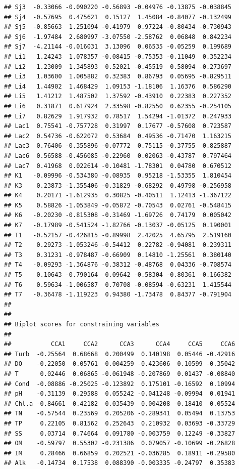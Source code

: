\documentclass[
]{book}
\begin{document}
\begin{verbatim}
## Sj3  -0.33066 -0.090220 -0.56893 -0.04976 -0.13875 -0.038845
## Sj4  -0.57695  0.475621  0.15127  1.45084 -0.84077 -0.132499
## Sj5  -0.85663  1.251094 -0.41979  0.97224 -0.80434 -0.730943
## Sj6  -1.97484  2.680997 -3.07550 -2.58762  0.06848  0.842234
## Sj7  -4.21144 -0.016031  3.13096  0.06535 -0.05259  0.199689
## Li1   1.24243  1.078357 -0.08415 -0.75353 -0.11049  0.352234
## Li2   1.23009  1.345893  0.52021 -0.45519  0.58094 -0.273697
## Li3   1.03600  1.005882  0.32383  0.86793  0.05695 -0.829511
## Li4   1.44902  1.468429  1.09153 -1.18106  1.16376  0.586290
## Li5   1.41212  1.487502  1.37592 -0.43910  0.22383  0.227352
## Li6   0.31871  0.617924  2.33598 -0.82550  0.62355 -0.254105
## Li7   0.82629  1.917932  0.78517  1.54294 -1.01372  0.247933
## Lac1  0.75541 -0.757728  0.31997  0.17677 -0.57608  0.723587
## Lac2  0.54736 -0.622072  0.53684  0.49536 -0.71470  1.163215
## Lac3  0.76406 -0.355896 -0.07772  0.75115 -0.37755  0.825887
## Lac6  0.56588 -0.456085 -0.22960  0.02063 -0.43787  0.797464
## Lac7  0.41968  0.022614 -0.10481 -1.78301  0.04780  0.670512
## K1   -0.09996 -0.534380 -0.08935  0.95218 -1.53355  1.810454
## K3    0.23873 -1.355406 -0.31829 -0.68292  0.49798 -0.256958
## K4    0.20171 -1.612935  0.30825 -0.40511  1.12413 -1.367122
## K5    0.58826 -1.053849 -0.05872 -0.70543  0.02761 -0.548415
## K6   -0.20230 -0.815308 -0.31469 -1.69726  0.74179  0.005042
## K7   -0.17989 -0.541524 -1.82766 -0.13037 -0.05125  0.190001
## T1   -0.52157 -0.426815 -0.89998  2.42025  4.65795  2.519160
## T2    0.29273 -1.053246 -0.54412  0.22782 -0.94081  0.239311
## T3    0.31231 -0.978487 -0.66909  0.14810 -1.25561  0.380140
## T4   -0.09293 -1.364876 -0.38312 -0.48768  0.04336 -0.708574
## T5    0.10643 -0.790164  0.09642 -0.58304 -0.80361 -0.166382
## T6    0.59634 -1.006587  0.70708 -0.08594 -0.63231  1.415544
## T7   -0.36478 -1.119223  0.94380 -1.73478  0.84377 -0.791904
## 
## 
## Biplot scores for constraining variables
## 
##           CCA1     CCA2      CCA3      CCA4     CCA5     CCA6
## Turb  -0.25564  0.68668  0.200499  0.140198  0.05446 -0.42916
## DO    -0.22050  0.05761  0.004259 -0.423606  0.10599 -0.35042
## T      0.02446  0.06865 -0.061948 -0.207869  0.01437 -0.08840
## Cond  -0.08886 -0.25025 -0.123892  0.175101 -0.16592  0.10994
## pH    -0.31139  0.29588  0.055242 -0.041248 -0.09994  0.01941
## Chl.a -0.84661  0.42182  0.035439  0.004208 -0.18410  0.05524
## TN    -0.57544  0.23569  0.205206 -0.289341  0.05494  0.13753
## TP     0.22105  0.81562  0.252643  0.210932  0.03693 -0.33729
## SS     0.03714  0.74664  0.091780 -0.003759  0.12249 -0.33827
## OM    -0.59797  0.55302 -0.231386  0.079057 -0.10699 -0.26828
## IM     0.28466  0.66859  0.202521 -0.036285  0.18911 -0.29580
## Alk   -0.14734  0.17538  0.088390 -0.003335 -0.24797  0.35383
\end{verbatim}
\end{document}
